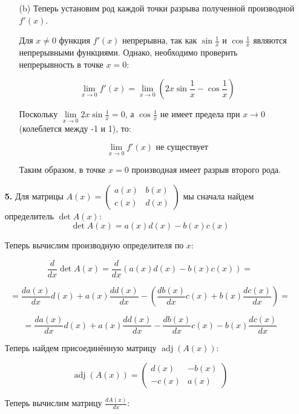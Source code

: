 \documentclass[a4paper]{article}
\newcommand{\lm}[1]{\underset{#1}{\lim}}
\begin{document}
\begin{enumerate}
\begin{enumerate}
        \item[(b)]Теперь установим род каждой точки разрыва полученной производной $ f'(x) $.

        Для $ x \neq 0 $ функция $ f'(x) $ непрерывна, так как $ \sin \frac{1}{x} $ и $ \cos \frac{1}{x} $ являются непрерывными функциями. Однако, необходимо проверить непрерывность в точке $ x = 0 $:
        
        $$
        \lim_{x \to 0} f'(x) = \lim_{x \to 0} \left(2x \sin \frac{1}{x} - \cos \frac{1}{x}\right)
        $$
        
        Поскольку $ \lm{x \to 0} 2x \sin \frac{1}{x} = 0 $, а $ \cos \frac{1}{x} $ не имеет предела при $ x \to 0 $ (колеблется между -1 и 1), то:
        
        $$
        \lim_{x \to 0} f'(x) \text{ не существует}
        $$
        
        Таким образом, в точке $ x = 0 $ производная имеет разрыв второго рода.

    \end{enumerate}
    
    \item[\textbf{5.}]
    Для матрицы $ A(x) = \begin{pmatrix} a(x) & b(x) \\ c(x) & d(x) \end{pmatrix} $ мы сначала найдем определитель $ \operatorname{det} A(x) $:
    $$
    \operatorname{det} A(x) = a(x)d(x) - b(x)c(x)
    $$
    
    Теперь вычислим производную определителя по $ x $:

    $$
    \frac{d}{dx} \operatorname{det} A(x) = \frac{d}{dx} (a(x)d(x) - b(x)c(x)) =
    $$
    
    $$
    = \frac{d a(x)}{dx} d(x) + a(x) \frac{d d(x)}{dx} - \left( \frac{d b(x)}{dx} c(x) + b(x) \frac{d c(x)}{dx} \right) =
    $$
    
    $$
    = \frac{d a(x)}{dx} d(x) + a(x) \frac{d d(x)}{dx} - \frac{d b(x)}{dx} c(x) - b(x) \frac{d c(x)}{dx}
    $$

    Теперь найдем присоединённую матрицу $ \operatorname{adj}(A(x)) $:

    $$
    \operatorname{adj}(A(x)) = \begin{pmatrix} d(x) & -b(x) \\ -c(x) & a(x) \end{pmatrix}
    $$
    
    Теперь вычислим матрицу $ \frac{d A(x)}{d x} $:


\end{enumerate}
\end{document}
